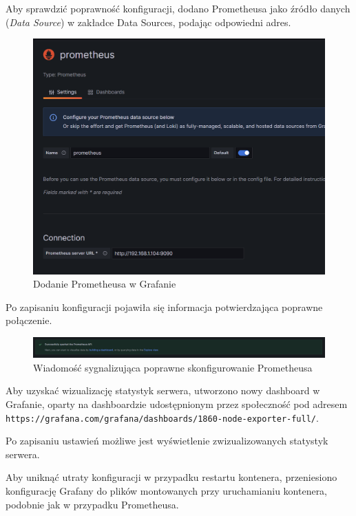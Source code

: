 \documentclass{article}
\begin{document}
Aby sprawdzić poprawność konfiguracji, dodano Prometheusa jako źródło danych (\textit{Data Source}) w zakładce Data Sources, podając odpowiedni adres.

\begin{figure}[H]
    \centering
    \includegraphics[width=1\linewidth]{prometheusDodanieGrafana.png}
    \caption{Dodanie Prometheusa w Grafanie}
    \label{fig:enter-label}
\end{figure}

Po zapisaniu konfiguracji pojawiła się informacja potwierdzająca poprawne połączenie.

\begin{figure}[H]
    \centering
    \includegraphics[width=1\linewidth]{grafanaPoprawnyPrometheus.png}
    \caption{Wiadomość sygnalizująca poprawne skonfigurowanie Prometheusa}
    \label{fig:enter-label}
\end{figure}

Aby uzyskać wizualizację statystyk serwera, utworzono nowy dashboard w Grafanie, oparty na dashboardzie udostępnionym przez społeczność pod adresem \lstinline|https://grafana.com/grafana/dashboards/1860-node-exporter-full/|.

Po zapisaniu ustawień możliwe jest wyświetlenie zwizualizowanych statystyk serwera.

Aby uniknąć utraty konfiguracji w przypadku restartu kontenera, przeniesiono konfigurację Grafany do plików montowanych przy uruchamianiu kontenera, podobnie jak w przypadku Prometheusa.
\end{document}

